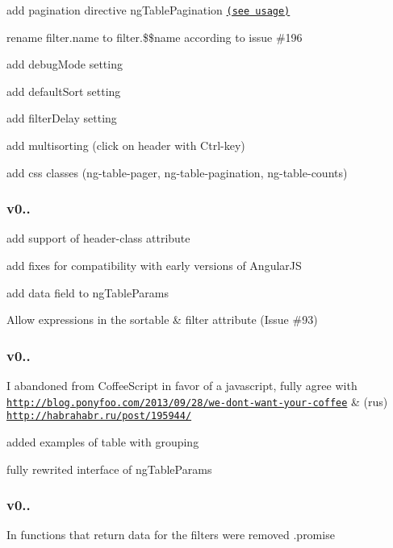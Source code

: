 \begin{DoxyItemize}
\item add pagination directive ng\+Table\+Pagination \href{https://github.com/esvit/ng-table/blob/master/examples/demo28.html}{\tt (see usage)}
\item rename filter.\+name to filter.\$\$name according to issue \#196
\item add debug\+Mode setting
\item add default\+Sort setting
\item add filter\+Delay setting
\item add multisorting (click on header with Ctrl-\/key)
\item add css classes (ng-\/table-\/pager, ng-\/table-\/pagination, ng-\/table-\/counts)
\end{DoxyItemize}

\subsubsection*{v0..}


\begin{DoxyItemize}
\item add support of {\ttfamily header-\/class} attribute
\item add fixes for compatibility with early versions of Angular\+JS
\item add {\ttfamily data} field to ng\+Table\+Params
\item Allow expressions in the sortable \& filter attribute (Issue \#93)
\end{DoxyItemize}

\subsubsection*{v0..}


\begin{DoxyItemize}
\item I abandoned from Coffee\+Script in favor of a javascript, fully agree with \href{http://blog.ponyfoo.com/2013/09/28/we-dont-want-your-coffee}{\tt http\+://blog.\+ponyfoo.\+com/2013/09/28/we-\/dont-\/want-\/your-\/coffee} \& (rus) \href{http://habrahabr.ru/post/195944/}{\tt http\+://habrahabr.\+ru/post/195944/}
\item added examples of table with grouping
\item fully rewrited interface of ng\+Table\+Params
\end{DoxyItemize}

\subsubsection*{v0..}

In functions that return data for the filters were removed {\ttfamily .promise} 
 